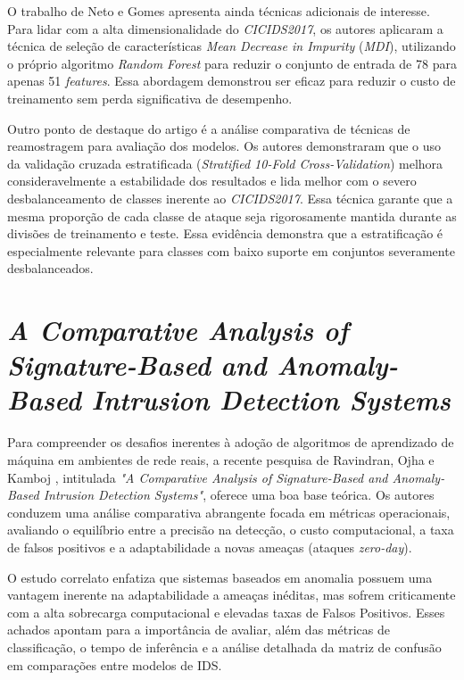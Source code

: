 O trabalho de Neto e Gomes apresenta ainda técnicas adicionais de interesse. Para lidar com a alta dimensionalidade do \textit{CICIDS2017}, os autores aplicaram a técnica de seleção de características \textit{Mean Decrease in Impurity} (\textit{MDI}), utilizando o próprio algoritmo \textit{Random Forest} para reduzir o conjunto de entrada de 78 para apenas 51 \textit{features}. Essa abordagem demonstrou ser eficaz para reduzir o custo de treinamento sem perda significativa de desempenho.

Outro ponto de destaque do artigo é a análise comparativa de técnicas de reamostragem para avaliação dos modelos. Os autores demonstraram que o uso da validação cruzada estratificada (\textit{Stratified 10-Fold Cross-Validation}) melhora consideravelmente a estabilidade dos resultados e lida melhor com o severo desbalanceamento de classes inerente ao \textit{CICIDS2017}. Essa técnica garante que a mesma proporção de cada classe de ataque seja rigorosamente mantida durante as divisões de treinamento e teste. Essa evidência demonstra que a estratificação é especialmente relevante para classes com baixo suporte em conjuntos severamente desbalanceados.

\section{\textit{A Comparative Analysis of Signature-Based and Anomaly-Based Intrusion Detection Systems}}

Para compreender os desafios inerentes à adoção de algoritmos de aprendizado de máquina em ambientes de rede reais, a recente pesquisa de Ravindran, Ojha e Kamboj \cite{ravindran2025}, intitulada \textit{"A Comparative Analysis of Signature-Based and Anomaly-Based Intrusion Detection Systems"}, oferece uma boa base teórica. Os autores conduzem uma análise comparativa abrangente focada em métricas operacionais, avaliando o equilíbrio entre a precisão na detecção, o custo computacional, a taxa de falsos positivos e a adaptabilidade a novas ameaças (ataques \textit{zero-day}).

O estudo correlato enfatiza que sistemas baseados em anomalia possuem uma vantagem inerente na adaptabilidade a ameaças inéditas, mas sofrem criticamente com a alta sobrecarga computacional e elevadas taxas de Falsos Positivos. Esses achados apontam para a importância de avaliar, além das métricas de classificação, o tempo de inferência e a análise detalhada da matriz de confusão em comparações entre modelos de IDS.

